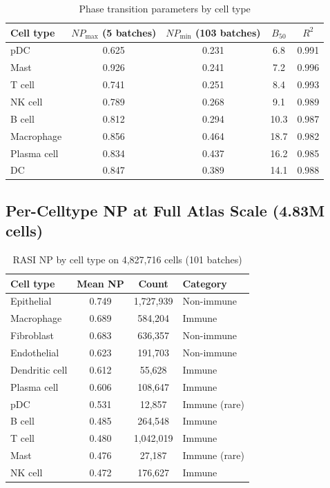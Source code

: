 \documentclass[10pt]{article}
\begin{document}
\begin{table}[H]
\centering
\caption{Phase transition parameters by cell type}
\begin{tabular}{lcccc}
\toprule
Cell type & $NP_{\max}$ (5 batches) & $NP_{\min}$ (103 batches) & $B_{50}$ & $R^2$ \\
\midrule
pDC & 0.625 & 0.231 & 6.8 & 0.991 \\
Mast & 0.926 & 0.241 & 7.2 & 0.996 \\
T cell & 0.741 & 0.251 & 8.4 & 0.993 \\
NK cell & 0.789 & 0.268 & 9.1 & 0.989 \\
B cell & 0.812 & 0.294 & 10.3 & 0.987 \\
Macrophage & 0.856 & 0.464 & 18.7 & 0.982 \\
Plasma cell & 0.834 & 0.437 & 16.2 & 0.985 \\
DC & 0.847 & 0.389 & 14.1 & 0.988 \\
\bottomrule
\end{tabular}
\end{table}

\subsection{Per-Celltype NP at Full Atlas Scale (4.83M cells)}

\begin{table}[H]
\centering
\caption{RASI NP by cell type on 4,827,716 cells (101 batches)}
\begin{tabular}{lccl}
\toprule
Cell type & Mean NP & Count & Category \\
\midrule
Epithelial & 0.749 & 1,727,939 & Non-immune \\
Macrophage & 0.689 & 584,204 & Immune \\
Fibroblast & 0.683 & 636,357 & Non-immune \\
Endothelial & 0.623 & 191,703 & Non-immune \\
Dendritic cell & 0.612 & 55,628 & Immune \\
Plasma cell & 0.606 & 108,647 & Immune \\
pDC & 0.531 & 12,857 & Immune (rare) \\
B cell & 0.485 & 264,548 & Immune \\
T cell & 0.480 & 1,042,019 & Immune \\
Mast & 0.476 & 27,187 & Immune (rare) \\
NK cell & 0.472 & 176,627 & Immune \\
\bottomrule
\end{tabular}
\end{table}
\end{document}
